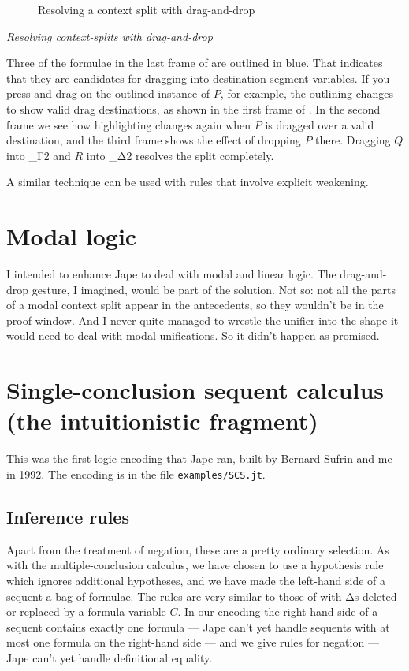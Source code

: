 \begin{figure}
\caption{Resolving a context split with drag-and-drop}
\label{fig:dragstages}
\end{figure}


\textit{Resolving context-splits with drag-and-drop}

Three of the formulae in the last frame of  are outlined in blue. That indicates that they are candidates for dragging into destination segment-variables. If you press and drag on the outlined instance of $P$, for example, the outlining changes to show valid drag destinations, as shown in the first frame of . In the second frame we see how highlighting changes again when $P$ is dragged over a valid destination, and the third frame shows the effect of dropping $P$ there. Dragging $Q$ into \_Γ2 and $R$ into \_Δ2 resolves the split completely.

A similar technique can be used with rules that involve explicit weakening.


\section{Modal logic}

I intended to enhance Jape to deal with modal and linear logic. The drag-and-drop gesture, I imagined, would be part of the solution. Not so: not all the parts of a modal context split appear in the antecedents, so they wouldn't be in the proof window. And I never quite managed to wrestle the unifier into the shape it would need to deal with modal unifications. So it didn't happen as promised.


\section{Single-conclusion sequent calculus (the intuitionistic fragment)}

This was the first logic encoding that Jape ran, built by Bernard Sufrin and me in 1992. The encoding is in the file \texttt{examples/SCS.jt}.

\subsection{Inference rules}

Apart from the treatment of negation, these are a pretty ordinary selection. As with the multiple-conclusion calculus, we have chosen to use a hypothesis rule which ignores additional hypotheses, and we have made the left-hand side of a sequent a bag of formulae. The rules are very similar to those of  with Δs deleted or replaced by a formula variable $C$. In our encoding the right-hand side of a sequent contains exactly one formula --- Jape can't yet handle sequents with at most one formula on the right-hand side --- and we give rules for negation --- Jape can't yet handle definitional equality. 

